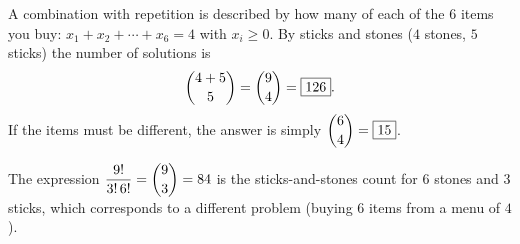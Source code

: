 A combination with repetition is described by how many of each of the $6$ items you buy: $x_1+x_2+\cdots+x_6=4$ with $x_i\ge 0$. By sticks and stones ($4$ stones, $5$ sticks) the number of solutions is
\[\dbinom{4+5}{5}=\dbinom94=\boxed{126}.\]
If the items must be different, the answer is simply $\dbinom64=\boxed{15}$.

The expression $\dfrac{9!}{3!\,6!}=\dbinom93=84$ is the sticks-and-stones count for $6$ stones and $3$ sticks, which corresponds to a different problem (buying $6$ items from a menu of $4$).

